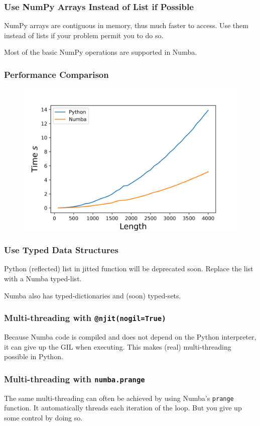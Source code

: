 \documentclass{beamer}
\newcommand{\icode}[1]{\texttt{#1}}  %
\begin{document}
\begin{frame}
\frametitle{Use NumPy Arrays Instead of List if Possible}
NumPy arrays are contiguous in memory, thus much faster to access. Use them instead of lists if your problem permit you to do so. \vspace*{0.3cm} \pause

Most of the basic NumPy operations are supported in Numba.
\end{frame}

\begin{frame}
\frametitle{Performance Comparison}
\begin{figure}
\centering
\includegraphics[width=.8\textwidth]{py_nb}
\end{figure}
\end{frame}

\begin{frame}
\frametitle{Use Typed Data Structures}
Python (reflected) list in jitted function will be deprecated soon. Replace the list with a Numba typed-list. \vspace*{0.3cm}\pause

Numba also has typed-dictionaries and (soon) typed-sets. 
\end{frame}

\begin{frame}
\frametitle{Multi-threading with \icode{@njit(nogil=True)}}
Because Numba code is compiled and does not depend on the Python interpreter, it can give up the GIL when executing. This makes (real) multi-threading possible in Python.
\end{frame}

\begin{frame}
\frametitle{Multi-threading with \icode{numba.prange}}
The same multi-threading can often be achieved by using Numba's \icode{prange} function. It automatically threads each iteration of the loop. But you give up some control by doing so.
\end{frame}
\end{document}
